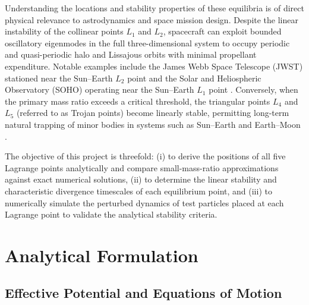 \documentclass[12pt, letterpaper]{article}
\begin{document}
Understanding the locations and stability properties of these equilibria is of direct physical relevance to astrodynamics and space mission design. Despite the linear instability of the collinear points $L_1$ and $L_2$, spacecraft can exploit bounded oscillatory eigenmodes in the full three-dimensional system to occupy periodic and quasi-periodic halo and Lissajous orbits with minimal propellant expenditure. Notable examples include the James Webb Space Telescope (JWST) stationed near the Sun--Earth $L_2$ point \cite{petersen} and the Solar and Heliospheric Observatory (SOHO) operating near the Sun--Earth $L_1$ point \cite{roberts}. Conversely, when the primary mass ratio exceeds a critical threshold, the triangular points $L_4$ and $L_5$ (referred to as Trojan points) become linearly stable, permitting long-term natural trapping of minor bodies in systems such as Sun--Earth and Earth--Moon \cite{cornish}.

The objective of this project is threefold: (i) to derive the positions of all five Lagrange points analytically and compare small-mass-ratio approximations against exact numerical solutions, (ii) to determine the linear stability and characteristic divergence timescales of each equilibrium point, and (iii) to numerically simulate the perturbed dynamics of test particles placed at each Lagrange point to validate the analytical stability criteria.

\section{Analytical Formulation}

\subsection{Effective Potential and Equations of Motion}
\end{document}

